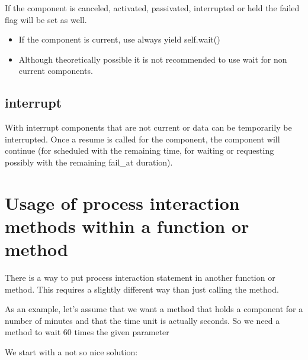 \documentclass[letterpaper,10pt,english]{sphinxmanual}
\begin{document}
If the component is canceled, activated, passivated, interrupted or held the failed flag will be set as well.
\begin{itemize}
\item {} 
If the component is current, use always yield self.wait()

\item {} 
Although theoretically possible it is not recommended to use wait for non current components.

\end{itemize}


\subsection{interrupt}
\label{\detokenize{Component:interrupt}}
With interrupt components that are not current or data can be temporarily be interrupted. Once a resume is called for
the component, the component will continue (for scheduled with the remaining time, for waiting or requesting possibly with
the remaining fail\_at duration).


\section{Usage of process interaction methods within a function or method}
\label{\detokenize{Component:usage-of-process-interaction-methods-within-a-function-or-method}}
There is a way to put process interaction statement in another function or method.
This requires a slightly different way than just calling the method.

As an example, let’s assume that we want a method that holds a component for a number of minutes and that the time unit is actually seconds.
So we need a method to wait 60 times the given parameter

We start with a not so nice solution:

\begin{sphinxVerbatim}[commandchars=\\\{\}]
 
     
           
           
\end{sphinxVerbatim}
\end{document}
